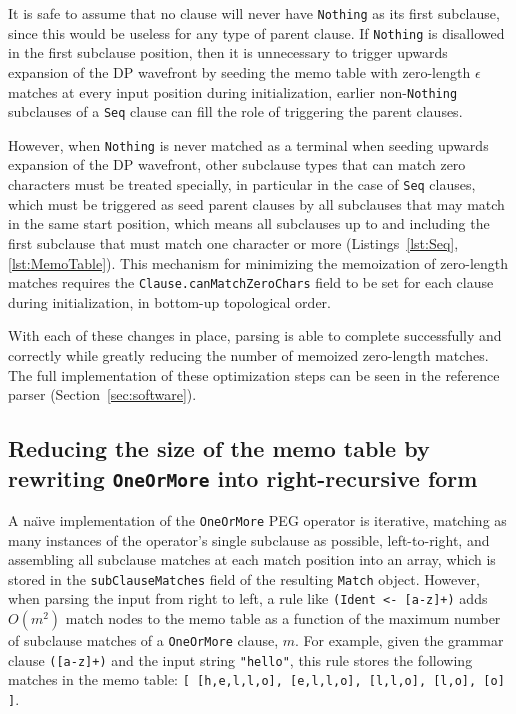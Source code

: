 \documentclass[manuscript,screen]{acmart}
\begin{document}
It is safe to assume that no clause will never have \texttt{Nothing} as its first subclause, since this would be useless for any type of parent clause. If \texttt{Nothing} is disallowed in the first subclause position, then it is unnecessary to trigger upwards expansion of the DP wavefront by seeding the memo table with zero-length $\epsilon$ matches at every input position during initialization, earlier non-\texttt{Nothing} subclauses of a \texttt{Seq} clause can fill the role of triggering the parent clauses.

However, when \texttt{Nothing} is never matched as a terminal when seeding upwards expansion of the DP wavefront, other subclause types that can match zero characters must be treated specially, in particular in the case of \texttt{Seq} clauses, which must be triggered as seed parent clauses by all subclauses that may match in the same start position, which means all subclauses up to and including the first subclause that must match one character or more (Listings~\ref{lst:Seq}, \ref{lst:MemoTable}). This mechanism for minimizing the memoization of zero-length matches requires the \texttt{Clause.canMatchZeroChars} field to be set for each clause during initialization, in bottom-up topological order.

With each of these changes in place, parsing is able to complete successfully and correctly while greatly reducing the number of memoized zero-length matches. The full implementation of these optimization steps can be seen in the reference parser (Section~\ref{sec:software}).

\subsection{Reducing the size of the memo table by rewriting \texttt{OneOrMore} into right-recursive form}

A na\"{\i}ve implementation of the \texttt{OneOrMore} PEG operator is iterative, matching as many instances of the operator's single subclause as possible, left-to-right, and assembling all subclause matches at each match position into an array, which is stored in the \texttt{subClauseMatches} field of the resulting \texttt{Match} object. However, when parsing the input from right to left, a rule like \texttt{(Ident <- [a-z]+)} adds $O(m^2)$ match nodes to the memo table as a function of the maximum number of subclause matches of a \texttt{OneOrMore} clause, $m$. For example, given the grammar clause \texttt{([a-z]+)} and the input string \texttt{"hello"}, this rule stores the following matches in the memo table: \texttt{[ [h,e,l,l,o], [e,l,l,o], [l,l,o], [l,o], [o] ]}.
\end{document}
